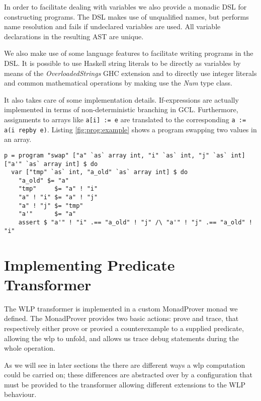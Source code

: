 \documentclass[]{scrartcl}
\begin{document}
In order to facilitate dealing with variables we also provide a monadic DSL for constructing programs.
The DSL makes use of unqualified names, but performs name resolution and fails if undeclared variables
are used. All variable declarations in the resulting AST are unique.

We also make use of some language features to facilitate writing programs in the DSL.
It is possible to use Haskell string literals to be directly as variables by means of the
\emph{OverloadedStrings} GHC extension and to directly use integer literals and common mathematical
operations by making use the \emph{Num} type class.

It also takes care of some implementation details. If-expressions are actually implemented in terms of
non-deterministic branching in GCL. Furthermore, assignments to arrays like
\lstinline|a[i] := e| are translated to the corresponding \lstinline|a := a(i repby e)|.
Listing \ref{fig:prog:example} shows a program swapping two values in an array.

\begin{lstlisting}[caption=A program swapping the values at two indices in an array, label=fig:prog:example]
p = program "swap" ["a" `as` array int, "i" `as` int, "j" `as` int] ["a'" `as` array int] $ do
  var ["tmp" `as` int, "a_old" `as` array int] $ do
    "a_old" $= "a"
    "tmp"     $= "a" ! "i"
    "a" ! "i" $= "a" ! "j"
    "a" ! "j" $= "tmp"
    "a'"      $= "a"
    assert $ "a'" ! "i" .== "a_old" ! "j" /\ "a'" ! "j" .== "a_old" ! "i"
\end{lstlisting}




\section{Implementing Predicate Transformer}
The WLP transformer is implemented in a custom MonadProver monad we defined.
The MonadProver provides two basic actions: prove and trace, that respectively
either prove or provied a counterexample to a supplied predicate, allowing the
wlp to unfold, and allows us trace debug statements during the whole operation.

As we will see in later sections the there are different ways a wlp computation
could be carried on; these differences are abstracted over by a configuration
that must be provided to the transformer allowing different extensions to the
WLP behaviour.
\end{document}

